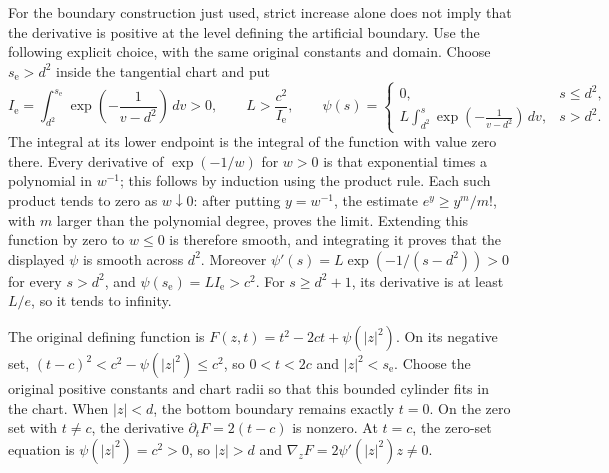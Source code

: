 \documentclass[
  11pt,
]{article}
\begin{document}
For the boundary construction just used, strict increase alone does not
imply that the derivative is positive at the level defining the
artificial boundary. Use the following explicit choice, with the same
original constants and domain. Choose \(s_{\mathrm e}>d^2\) inside the
tangential chart and put \[
 I_{\mathrm e}=\int_{d^2}^{s_{\mathrm e}}
                 \exp\!\left(-\frac1{v-d^2}\right)\,dv>0,
 \qquad L>\frac{c^2}{I_{\mathrm e}},
 \qquad
 \psi(s)=
 \begin{cases}
 0,&s\leq d^2,\\
 L\displaystyle\int_{d^2}^{s}
                 \exp\!\left(-\frac1{v-d^2}\right)\,dv,&s>d^2.
 \end{cases}
 \tag{DSP-AUX1}
\] The integral at its lower endpoint is the integral of the function
with value zero there. Every derivative of \(\exp(-1/w)\) for \(w>0\) is
that exponential times a polynomial in \(w^{-1}\); this follows by
induction using the product rule. Each such product tends to zero as
\(w\downarrow0\): after putting \(y=w^{-1}\), the estimate
\(e^y\geq y^m/m!\), with \(m\) larger than the polynomial degree, proves
the limit. Extending this function by zero to \(w\leq0\) is therefore
smooth, and integrating it proves that the displayed \(\psi\) is smooth
across \(d^2\). Moreover \(\psi'(s)=L\exp(-1/(s-d^2))>0\) for every
\(s>d^2\), and \(\psi(s_{\mathrm e})=LI_{\mathrm e}>c^2\). For
\(s\geq d^2+1\), its derivative is at least \(L/e\), so it tends to
infinity.

The original defining function is \(F(z,t)=t^2-2ct+\psi(|z|^2)\). On its
negative set, \((t-c)^2<c^2-\psi(|z|^2)\leq c^2\), so \(0<t<2c\) and
\(|z|^2<s_{\mathrm e}\). Choose the original positive constants and
chart radii so that this bounded cylinder fits in the chart. When
\(|z|<d\), the bottom boundary remains exactly \(t=0\). On the zero set
with \(t\ne c\), the derivative \(\partial_tF=2(t-c)\) is nonzero. At
\(t=c\), the zero-set equation is \(\psi(|z|^2)=c^2>0\), so \(|z|>d\)
and \(\nabla_zF=2\psi'(|z|^2)z\ne0\).
\end{document}
